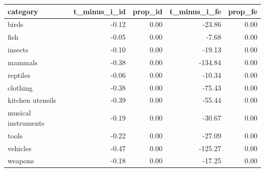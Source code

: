 \begin{table}[ht]
\centering
\begin{tabular}{lrrrr}
  \hline
category & t\_minus\_i\_id & prop\_id & t\_minus\_i\_fe & prop\_fe \\ 
  \hline
birds & -0.12 & 0.00 & -23.86 & 0.00 \\ 
  fish & -0.05 & 0.00 & -7.68 & 0.00 \\ 
  insects & -0.10 & 0.00 & -19.13 & 0.00 \\ 
  mammals & -0.38 & 0.00 & -134.84 & 0.00 \\ 
  reptiles & -0.06 & 0.00 & -10.34 & 0.00 \\ 
  clothing & -0.38 & 0.00 & -75.43 & 0.00 \\ 
  kitchen utensils & -0.39 & 0.00 & -55.44 & 0.00 \\ 
  musical instruments & -0.19 & 0.00 & -30.67 & 0.00 \\ 
  tools & -0.22 & 0.00 & -27.09 & 0.00 \\ 
  vehicles & -0.47 & 0.00 & -125.27 & 0.00 \\ 
  weapons & -0.18 & 0.00 & -17.25 & 0.00 \\ 
   \hline
\end{tabular}
\end{table}
